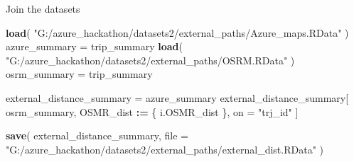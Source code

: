\documentclass[]{article}
\newenvironment{Shaded}{\begin{snugshade}}{\end{snugshade}}
\newcommand{\DataTypeTok}[1]{\textcolor[rgb]{0.13,0.29,0.53}{#1}}
\newcommand{\ErrorTok}[1]{\textcolor[rgb]{0.64,0.00,0.00}{\textbf{#1}}}
\newcommand{\KeywordTok}[1]{\textcolor[rgb]{0.13,0.29,0.53}{\textbf{#1}}}
\newcommand{\NormalTok}[1]{#1}
\newcommand{\OperatorTok}[1]{\textcolor[rgb]{0.81,0.36,0.00}{\textbf{#1}}}
\newcommand{\StringTok}[1]{\textcolor[rgb]{0.31,0.60,0.02}{#1}}
\begin{document}
Join the datasets

\begin{Shaded}
\begin{Highlighting}[]
\KeywordTok{load}\NormalTok{( }\StringTok{"G:/azure_hackathon/datasets2/external_paths/Azure_maps.RData"}\NormalTok{ )}
\NormalTok{azure_summary =}\StringTok{ }\NormalTok{trip_summary}
\KeywordTok{load}\NormalTok{( }\StringTok{"G:/azure_hackathon/datasets2/external_paths/OSRM.RData"}\NormalTok{ )}
\NormalTok{osrm_summary =}\StringTok{ }\NormalTok{trip_summary}

\NormalTok{external_distance_summary =}\StringTok{ }\NormalTok{azure_summary}
\NormalTok{external_distance_summary[ osrm_summary, OSMR_dist }\OperatorTok{:}\ErrorTok{=}\StringTok{ }\NormalTok{\{}
\NormalTok{    i.OSMR_dist}
\NormalTok{\}, on =}\StringTok{ "trj_id"}\NormalTok{ ]}

\KeywordTok{save}\NormalTok{( external_distance_summary, }
    \DataTypeTok{file =} \StringTok{"G:/azure_hackathon/datasets2/external_paths/external_dist.RData"}\NormalTok{ )}
\end{Highlighting}
\end{Shaded}
\end{document}
